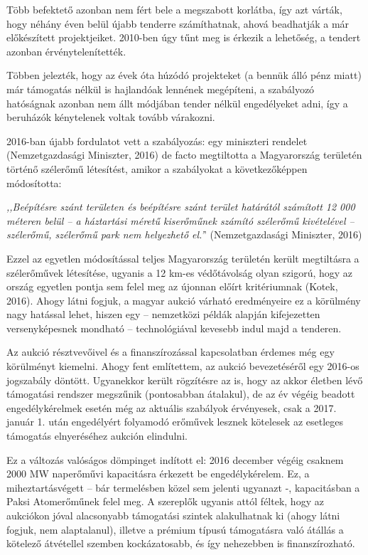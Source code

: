 \documentclass[twoside, magyar, showtrims]{corvinusphd}
\begin{document}
Több befektető azonban nem fért bele
a megszabott korlátba, így azt várták,
hogy néhány éven belül újabb tenderre
számíthatnak, ahová beadhatják a már előkészített projektjeiket.
2010-ben úgy tűnt meg is érkezik a lehetőség,
a tendert azonban érvénytelenítették.

Többen jelezték, hogy az évek óta húzódó
projekteket (a bennük álló pénz miatt) már támogatás
nélkül is hajlandóak lennének megépíteni, a szabályozó hatóságnak
azonban nem állt módjában tender nélkül
engedélyeket adni, így a beruházók
kénytelenek voltak tovább várakozni.

2016-ban újabb fordulatot vett a szabályozás:
egy miniszteri rendelet (Nemzetgazdasági Miniszter, 2016)
de facto megtiltotta a Magyarország területén történő szélerőmű létesítést,
amikor a szabályokat a következőképpen módosította:

\textit{,,Beépítésre szánt területen
és beépítésre szánt terület határától számított 12 000 méteren belül –
a háztartási méretű kiserőműnek számító szélerőmű kivételével –
szélerőmű, szélerőmű park nem helyezhető el.'}' (Nemzetgazdasági Miniszter, 2016)

Ezzel az egyetlen módosítással teljes Magyarország területén került
megtiltásra a szélerőművek létesítése, ugyanis a 12 km-es 
védőtávolság olyan szigorú, hogy az ország egyetlen pontja sem felel
meg az újonnan előírt kritériumnak (Kotek, 2016).
Ahogy látni fogjuk, a magyar aukció várható eredményeire
ez a körülmény nagy hatással lehet, hiszen egy -- nemzetközi
példák alapján kifejezetten versenyképesnek mondható -- technológiával
kevesebb indul majd a tenderen.

Az aukció résztvevőivel és a finanszírozással kapcsolatban érdemes még egy
körülményt kiemelni. Ahogy fent említettem, az aukció bevezetéséről egy
2016-os jogszabály döntött. Ugyanekkor került
rögzítésre az is, hogy az akkor életben lévő támogatási rendszer
megszűnik (pontosabban átalakul), de az év végéig beadott engedélykérelmek
esetén még az aktuális szabályok érvényesek, csak a 2017. január 1. után
engedélyért folyamodó erőművek lesznek kötelesek az esetleges
támogatás elnyeréséhez aukción elindulni.

Ez a változás valóságos dömpinget indított el: 2016 december végéig
csaknem 2000 MW naperőművi kapacitásra érkezett be
engedélykérelem. Ez, a miheztartásvégett -- bár termelésben közel
sem jelenti ugyanazt -, kapacitásban a Paksi Atomerőműnek felel meg.
A szereplők ugyanis attól féltek, hogy az aukciókon
jóval alacsonyabb támogatási szintek alakulhatnak ki
(ahogy látni fogjuk, nem alaptalanul),
illetve a prémium típusú támogatásra való átállás a kötelező átvétellel
szemben kockázatosabb, és így nehezebben is finanszírozható.
\end{document}

